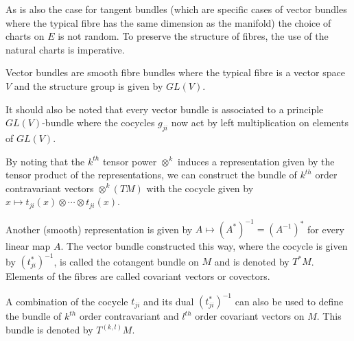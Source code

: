 	\begin{remark}
		As is also the case for tangent bundles (which are specific cases of vector bundles where the typical fibre has the same dimension as the manifold) the choice of charts on $E$ is not random. To preserve the structure of fibres, the use of the natural charts is imperative.
	\end{remark}
	\begin{remark}
		Vector bundles are smooth fibre bundles where the typical fibre is a vector space $V$ and the structure group is given by $GL(V)$.
	\end{remark}
	
	\begin{remark}
		\label{manifolds:vector_principal_correspondence}
		It should also be noted that every vector bundle is associated to a principle $GL(V)$-bundle where the cocycles $g_{ji}$ now act by left multiplication on elements of $GL(V)$.
	\end{remark}

	\begin{example}
		By noting that the $k^{th}$ tensor power $\otimes^k$ induces a representation given by the tensor product of the representations, we can construct the bundle of $k^{th}$ order contravariant vectors $\otimes^k(TM)$ with the cocycle given by $x\mapsto t_{ji}(x)\otimes\cdots\otimes t_{ji}(x)$.
	\end{example}
	\begin{example}
		Another (smooth) representation is given by $A\mapsto (A^*)^{-1}=(A^{-1})^*$ for every linear map $A$. The vector bundle constructed this way, where the cocycle is given by $(t_{ji}^*)^{-1}$, is called the cotangent bundle on $M$ and is denoted by $T^*M$. Elements of the fibres are called covariant vectors or covectors.
	\end{example}
	\begin{notation}
		A combination of the cocycle $t_{ji}$ and its dual $(t_{ji}^*)^{-1}$ can also be used to define the bundle of $k^{th}$ order contravariant and $l^{th}$ order covariant vectors on $M$. This bundle is denoted by $T^{(k, l)}M$.
	\end{notation}
	
